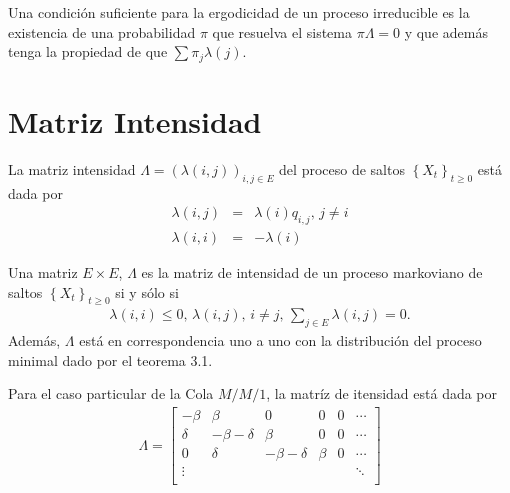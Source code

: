 \begin{Cor}\label{Cor.4.4}
Una condici\'on suficiente para la ergodicidad de un proceso irreducible es la existencia de una probabilidad $\pi$ que resuelva el sistema $\pi\Lambda=0$ y que adem\'as tenga la propiedad de que $\sum\pi_{j}\lambda\left(j\right)$.
\end{Cor}

%
\section{Matriz Intensidad}
%


\begin{Def}
La matriz intensidad
$\Lambda=\left(\lambda\left(i,j\right)\right)_{i,j\in E}$ del proceso de saltos $\left\{X_{t}\right\}_{t\geq0}$ est\'a dada por
\begin{eqnarray*}
\lambda\left(i,j\right)&=&\lambda\left(i\right)q_{i,j}\textrm{,    }j\neq i\\
\lambda\left(i,i\right)&=&-\lambda\left(i\right)
\end{eqnarray*}
\end{Def}


\begin{Prop}\label{Prop.3.1}
Una matriz $E\times E$, $\Lambda$ es la matriz de intensidad de un proceso markoviano de saltos $\left\{X_{t}\right\}_{t\geq0}$ si y s\'olo si
\begin{eqnarray*}
\lambda\left(i,i\right)\leq0\textrm{, }\lambda\left(i,j\right)\textrm{,   }i\neq j\textrm{,  }\sum_{j\in E}\lambda\left(i,j\right)=0.
\end{eqnarray*}
Adem\'as, $\Lambda$ est\'a en correspondencia uno a uno con la
distribuci\'on del proceso minimal dado por el teorema 3.1.
\end{Prop}


Para el caso particular de la Cola $M/M/1$, la matr\'iz de itensidad est\'a dada por
\begin{eqnarray*}
\Lambda=\left[\begin{array}{cccccc}
-\beta & \beta & 0 &0 &0& \cdots\\
\delta & -\beta-\delta & \beta & 0 & 0 &\cdots\\
0 & \delta & -\beta-\delta & \beta & 0 &\cdots\\
\vdots & & & & & \ddots\\
\end{array}\right]
\end{eqnarray*}


